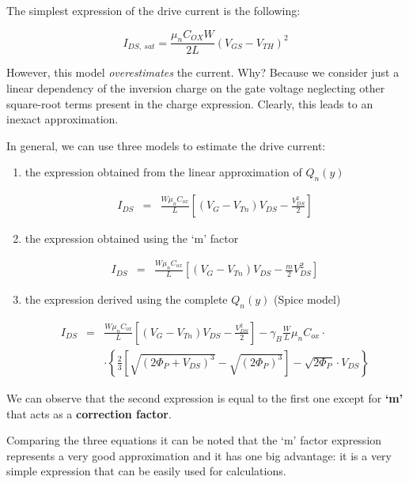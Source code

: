 \documentclass[a4paper, 12pt, twoside, openright]{report}
\begin{document}
The simplest expression of the drive current is the following:

\begin{equation}
I_{DS,\ sat} = \frac{\mu_n C_{OX} W}{2L} (V_{GS} - V_{TH})^2
\label{}
\end{equation}

However, this model \emph{overestimates} the current. Why? Because we consider just a linear dependency of the inversion charge on the gate voltage neglecting other square-root terms present in the charge expression. Clearly, this leads to an inexact approximation.

In general, we can use three models to estimate the drive current:

\begin{enumerate}
\item the expression obtained from the linear approximation of $Q_{n}(y)$

	\begin{eqnarray*}
	 I_{DS} &=&\frac{W \mu_n C_{ox}}{L}\left[\left(V_G-V_{Tn}\right)V_{DS}-\frac{V_{DS}^2}{2}\right]
	\end{eqnarray*}

\item the expression obtained using the `m' factor

	\begin{eqnarray*}
	 I_{DS} &=&\frac{W \mu_n C_{ox}}{L}\left[\left(V_G-V_{Tn}\right)V_{DS}-\frac{ {m}}{2}V_{DS}^2\right]
	\end{eqnarray*}

\item the expression derived using the complete $Q_{n}(y)$ (Spice model)

	\begin{eqnarray*}
	I_{DS} &=&\frac{W \mu_n C_{ox}}{L}\left[\left(V_G-V_{Tn}\right)V_{DS}-\frac{V_{DS}^2}{2}\right]
	        -\gamma_B \frac{W}{L}\mu_n C_{ox}\cdot\\
	        & &\cdot\left\{\frac{2}{3}\left[\sqrt{\left(2\Phi_P +V_{DS}\right)^3}
	            -\sqrt{\left(2\Phi_P\right)^3}\right]-\sqrt{2\Phi_P}\cdot V_{DS}\right\}
	\end{eqnarray*}

\end{enumerate}

We can observe that the second expression is equal to the first one except for \textbf{`m'} that acts as a \textbf{correction factor}.

Comparing the three equations it can be noted that the `m' factor expression represents a very good approximation and it has one big advantage: it is a very simple expression that can be easily used for calculations.
\end{document}
